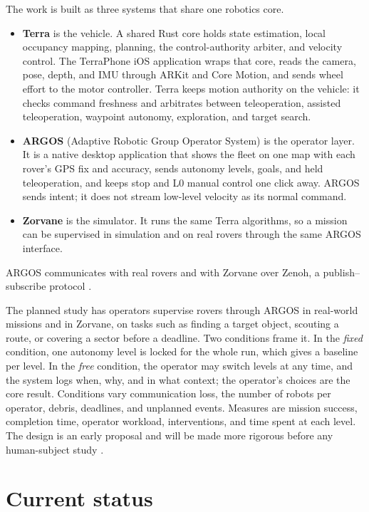 The work is built as three systems that share one robotics core.

\begin{itemize}
\item \textbf{Terra} is the vehicle.
  A shared Rust core holds state estimation, local occupancy mapping, planning, the control-authority arbiter, and velocity control.
  The TerraPhone iOS application wraps that core, reads the camera, pose, depth, and IMU through ARKit and Core Motion, and sends wheel effort to the motor controller.
  Terra keeps motion authority on the vehicle: it checks command freshness and arbitrates between teleoperation, assisted teleoperation, waypoint autonomy, exploration, and target search.
\item \textbf{ARGOS} (Adaptive Robotic Group Operator System) is the operator layer.
  It is a native desktop application that shows the fleet on one map with each rover's GPS fix and accuracy, sends autonomy levels, goals, and held teleoperation, and keeps stop and L0 manual control one click away.
  ARGOS sends intent; it does not stream low-level velocity as its normal command.
\item \textbf{Zorvane} is the simulator.
  It runs the same Terra algorithms, so a mission can be supervised in simulation and on real rovers through the same ARGOS interface.
\end{itemize}

ARGOS communicates with real rovers and with Zorvane over Zenoh, a publish--subscribe protocol .

The planned study has operators supervise rovers through ARGOS in real-world missions and in Zorvane, on tasks such as finding a target object, scouting a route, or covering a sector before a deadline.
Two conditions frame it.
In the \emph{fixed} condition, one autonomy level is locked for the whole run, which gives a baseline per level.
In the \emph{free} condition, the operator may switch levels at any time, and the system logs when, why, and in what context; the operator's choices are the core result.
Conditions vary communication loss, the number of robots per operator, debris, deadlines, and unplanned events.
Measures are mission success, completion time, operator workload, interventions, and time spent at each level.
The design is an early proposal and will be made more rigorous before any human-subject study .

\section*{Current status}

